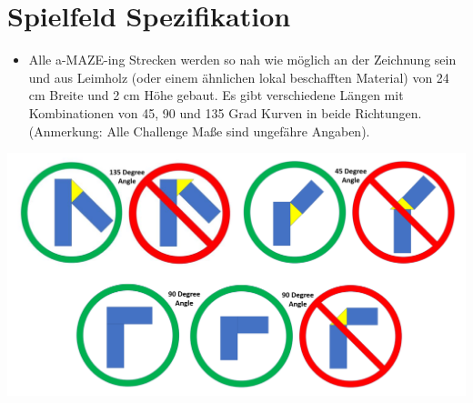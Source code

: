 \documentclass[a4paper,12pt]{article}
\begin{document}
\section{Spielfeld Spezifikation}
\begin{itemize}
	\item Alle a-MAZE-ing Strecken werden so nah wie möglich an der
		Zeichnung sein und aus Leimholz (oder einem ähnlichen lokal
		beschafften Material) von 24 cm Breite und 2 cm Höhe gebaut. Es
		gibt verschiedene Längen mit Kombinationen von 45, 90 und 135
		Grad Kurven in beide Richtungen. (Anmerkung: Alle Challenge
		Maße sind ungefähre Angaben).
\end{itemize}
\includegraphics[width=1.0\textwidth]{amazeing_allowed.png}
\end{document}
